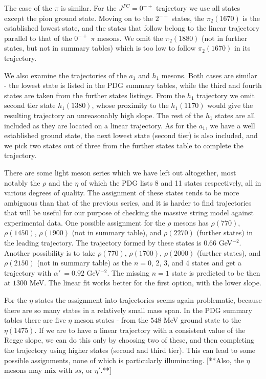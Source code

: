 \documentclass[11pt,a4]{article}
\newcommand{\alp}{\ensuremath{\alpha'\:}}
\newcommand{\ssb}{s\bar{s}}
\begin{document}
The case of the \(\pi\) is similar. For the \(J^{PC} = 0^{-+}\) trajectory we use all states except the pion ground state. Moving on to the \(2^{-+}\) states, the \(\pi_2(1670)\) is the established lowest state, and the states that follow belong to the linear trajectory parallel to that of the \(0^{-+}\) \(\pi\) mesons. We omit the \(\pi_2(1880)\) (not in further states, but not in summary tables) which is too low to follow \(\pi_2(1670)\) in its trajectory.

We also examine the trajectories of the \(a_1\) and \(h_1\) mesons. Both cases are similar - the lowest state is listed in the PDG summary tables, while the third and fourth states are taken from the further states listings. From the \(h_1\) trajectory we omit second tier state \(h_1(1380)\), whose proximity to the \(h_1(1170)\) would give the resulting trajectory an unreasonably high slope. The rest of the \(h_1\) states are all included as they are located on a linear trajectory. As for the \(a_1\), we have a well established ground state, the next lowest state (second tier) is also included, and we pick two states out of three from the further states table to complete the trajectory.

There are some light meson series which we have left out altogether, most notably the \(\rho\) and the \(\eta\) of which the PDG lists 8 and 11 states respectively, all in various degrees of quality. The assignment of these states tends to be more ambiguous than that of the previous series, and it is harder to find trajectories that will be useful for our purpose of checking the massive string model against experimental data. One possible assignment for the \(\rho\) mesons has \(\rho(770)\), \(\rho(1450)\), \(\rho(1900)\) (not in summary table), and \(\rho(2270)\) (further states) in the leading trajectory. The trajectory formed by these states is \(0.66\) GeV\(^{-2}\). Another possibility is to take \(\rho(770)\), \(\rho(1700)\), \(\rho(2000)\) (further states), and \(\rho(2150)\) (not in summary table) as the \(n = 0\), \(2\), \(3\), and \(4\) states and get a trajectory with \(\alp = 0.92\) GeV\(^{-2}\). The missing \(n = 1\) state is predicted to be then at \(1300\) MeV. The linear fit works better for the first option, with the lower slope.

For the \(\eta\) states the assignment into trajectories seems again problematic, because there are so many states in a relatively small mass span. In the PDG summary tables there are five \(\eta\) meson states - from the \(548\) MeV ground state to the \(\eta(1475)\). If we are to have a linear trajectory with a consistent value of the Regge slope, we can do this only by choosing two of these, and then completing the trajectory using higher states (second and third tier). This can lead to some possible assignments, none of which is particularly illuminating. [**Also, the \(\eta\) mesons may mix with \(\ssb\), or \(\eta\prime\).**]
\end{document}
